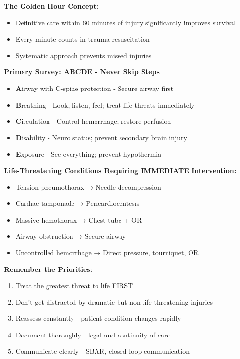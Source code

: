 \documentclass[11pt]{article}
\begin{document}
\begin{tcolorbox}[colback=blue!5!white,colframe=blue!75!black,title=\textbf{TRAUMA NURSING: THE BIG PICTURE}]

\textbf{The Golden Hour Concept:}
\begin{itemize}
    \item Definitive care within 60 minutes of injury significantly improves survival
    \item Every minute counts in trauma resuscitation
    \item Systematic approach prevents missed injuries
\end{itemize}

\vspace{0.3cm}

\textbf{Primary Survey: ABCDE - Never Skip Steps}
\begin{itemize}
    \item \textbf{A}irway with C-spine protection - Secure airway first
    \item \textbf{B}reathing - Look, listen, feel; treat life threats immediately
    \item \textbf{C}irculation - Control hemorrhage; restore perfusion
    \item \textbf{D}isability - Neuro status; prevent secondary brain injury
    \item \textbf{E}xposure - See everything; prevent hypothermia
\end{itemize}

\vspace{0.3cm}

\textbf{Life-Threatening Conditions Requiring IMMEDIATE Intervention:}
\begin{itemize}
    \item Tension pneumothorax → Needle decompression
    \item Cardiac tamponade → Pericardiocentesis
    \item Massive hemothorax → Chest tube + OR
    \item Airway obstruction → Secure airway
    \item Uncontrolled hemorrhage → Direct pressure, tourniquet, OR
\end{itemize}

\vspace{0.3cm}

\textbf{Remember the Priorities:}
\begin{enumerate}
    \item Treat the greatest threat to life FIRST
    \item Don't get distracted by dramatic but non-life-threatening injuries
    \item Reassess constantly - patient condition changes rapidly
    \item Document thoroughly - legal and continuity of care
    \item Communicate clearly - SBAR, closed-loop communication
\end{enumerate}

\end{tcolorbox}
\end{document}
